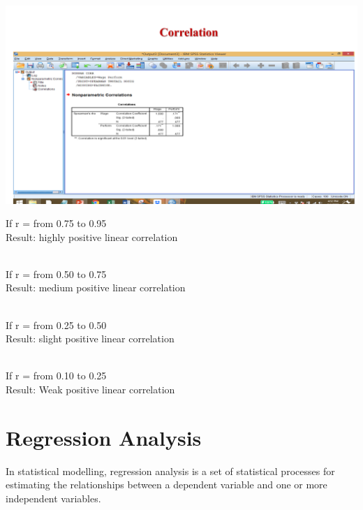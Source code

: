 \documentclass[
  letterpaper,
  DIV=11,
  numbers=noendperiod]{scrreprt}
\begin{document}
\includegraphics{images/slides/img_Page_133.png}

\begin{tcolorbox}[enhanced jigsaw, rightrule=.15mm, arc=.35mm, colframe=quarto-callout-note-color-frame, coltitle=black, left=2mm, colbacktitle=quarto-callout-note-color!10!white, bottomtitle=1mm, titlerule=0mm, colback=white, breakable, opacitybacktitle=0.6, opacityback=0, toprule=.15mm, toptitle=1mm, title=\textcolor{quarto-callout-note-color}{\faInfo}\hspace{0.5em}{Correlation Decision Criteria}, bottomrule=.15mm, leftrule=.75mm]

If r = from 0.75 to 0.95\\
Result: highly positive linear correlation\\
\strut \\
If r = from 0.50 to 0.75\\
Result: medium positive linear correlation\\
\strut \\
If r = from 0.25 to 0.50\\
Result: slight positive linear correlation\\
\strut \\
If r = from 0.10 to 0.25\\
Result: Weak positive linear correlation\\

\end{tcolorbox}


\chapter{Regression Analysis}\label{regression-analysis}

In statistical modelling, regression analysis is a set of statistical
processes for estimating the relationships between a dependent variable
and one or more independent variables.\\
\end{document}
